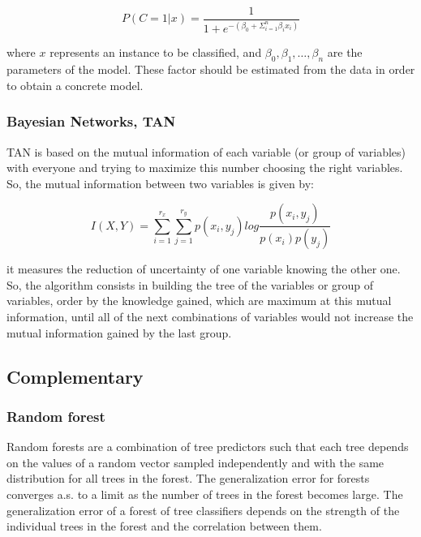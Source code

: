 \documentclass[conference,a4paper]{IEEEtran}
\begin{document}
\begin{equation}
	P(C = 1 | x) = \frac{1}{1 + e^{-(\beta_{0} + \Sigma^{n}_{i=1} \beta_{i} x_{i})}}
	\label{eq:logistic}
\end{equation}

where $x$ represents an instance to be classified, and $\beta_0, \beta_1, \dots , \beta_n$ are the parameters of the model. These factor should be estimated from the data in order to obtain a concrete model.

\subsubsection{Bayesian Networks, TAN}

TAN is based on the mutual information of each variable (or group of variables) with everyone and trying to maximize this number choosing the right variables. So, the mutual information between two variables is given by:

\begin{equation}
	I(X,Y) = \sum_{i=1}^{r_x}\sum_{j=1}^{r_y} p(x_i, y_j) log \frac{p(x_i,y_j)}{p(x_i)p(y_j)}
	\label{eq:tan}
\end{equation}

it measures the reduction of uncertainty of one variable knowing the other one. So, the algorithm consists in building the tree of the variables or group of variables, order by the knowledge gained, which are maximum at this mutual information, until all of the next combinations of variables would not increase the mutual information gained by the last group.

\subsection{Complementary}

\subsubsection{Random forest \cite{RandomForest}}

Random forests are a combination of tree predictors such that each tree depends on the values of a random vector sampled independently and with the same distribution for all trees in the forest. The  generalization error for forests converges a.s. to a limit as the number of trees in the forest becomes large. The generalization error of a forest of tree classifiers depends on the strength of the individual trees in the forest and the correlation between them.
\end{document}
